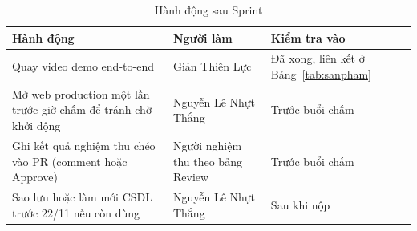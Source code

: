 \documentclass[a4paper]{article}
\begin{document}
\begin{table}[htbp]\centering
\caption{Hành động sau Sprint}\label{tab:action}
\begin{tabular}{@{}p{6.3cm}p{3.2cm}p{3.2cm}@{}}\toprule
\textbf{Hành động} & \textbf{Người làm} & \textbf{Kiểm tra vào} \\ \midrule
Quay video demo end-to-end & Giản Thiên Lực & Đã xong, liên kết ở Bảng~\ref{tab:sanpham} \\
Mở web production một lần trước giờ chấm để tránh chờ khởi động & Nguyễn Lê Nhựt Thắng & Trước buổi chấm \\
Ghi kết quả nghiệm thu chéo vào PR (comment hoặc Approve) & Người nghiệm thu theo bảng Review & Trước buổi chấm \\
Sao lưu hoặc làm mới CSDL trước 22/11 nếu còn dùng & Nguyễn Lê Nhựt Thắng & Sau khi nộp \\ \bottomrule
\end{tabular}
\end{table}
\end{document}
